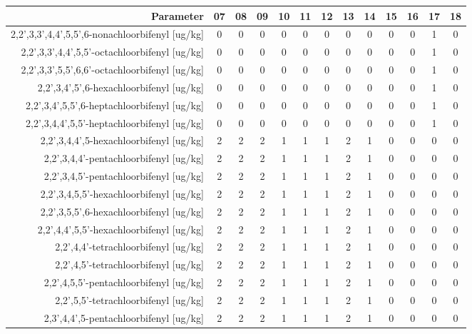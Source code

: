 \begin{tabular}{ r |c | c | c | c | c |c | c | c | c | c | c | c } 
\rowcolor[HTML]{EFEFEF}  
 Parameter & 07 & 08 & 09 & 10 & 11 & 12 & 13 & 14 & 15 & 16 & 17 & 18 \\    \hline     
2,2',3,3',4,4',5,5',6-nonachloorbifenyl [ug/kg] &0 & 0 & 0 & 0 & 0 & 0 & 0 & 0 & 0 & 0 & 1 & 0 \\
2,2',3,3',4,4',5,5'-octachloorbifenyl [ug/kg] &0 & 0 & 0 & 0 & 0 & 0 & 0 & 0 & 0 & 0 & 1 & 0 \\
2,2',3,3',5,5',6,6'-octachloorbifenyl [ug/kg] &0 & 0 & 0 & 0 & 0 & 0 & 0 & 0 & 0 & 0 & 1 & 0 \\
2,2',3,4',5',6-hexachloorbifenyl [ug/kg] &0 & 0 & 0 & 0 & 0 & 0 & 0 & 0 & 0 & 0 & 1 & 0 \\
2,2',3,4',5,5',6-heptachloorbifenyl [ug/kg] &0 & 0 & 0 & 0 & 0 & 0 & 0 & 0 & 0 & 0 & 1 & 0 \\
2,2',3,4,4',5,5'-heptachloorbifenyl [ug/kg] &0 & 0 & 0 & 0 & 0 & 0 & 0 & 0 & 0 & 0 & 1 & 0 \\
2,2',3,4,4',5-hexachloorbifenyl [ug/kg] &2 & 2 & 2 & 1 & 1 & 1 & 2 & 1 & 0 & 0 & 0 & 0 \\
2,2',3,4,4'-pentachloorbifenyl [ug/kg] &2 & 2 & 2 & 1 & 1 & 1 & 2 & 1 & 0 & 0 & 0 & 0 \\
2,2',3,4,5'-pentachloorbifenyl [ug/kg] &2 & 2 & 2 & 1 & 1 & 1 & 2 & 1 & 0 & 0 & 0 & 0 \\
2,2',3,4,5,5'-hexachloorbifenyl [ug/kg] &2 & 2 & 2 & 1 & 1 & 1 & 2 & 1 & 0 & 0 & 0 & 0 \\
2,2',3,5,5',6-hexachloorbifenyl [ug/kg] &2 & 2 & 2 & 1 & 1 & 1 & 2 & 1 & 0 & 0 & 0 & 0 \\
2,2',4,4',5,5'-hexachloorbifenyl [ug/kg] &2 & 2 & 2 & 1 & 1 & 1 & 2 & 1 & 0 & 0 & 0 & 0 \\
2,2',4,4'-tetrachloorbifenyl [ug/kg] &2 & 2 & 2 & 1 & 1 & 1 & 2 & 1 & 0 & 0 & 0 & 0 \\
2,2',4,5'-tetrachloorbifenyl [ug/kg] &2 & 2 & 2 & 1 & 1 & 1 & 2 & 1 & 0 & 0 & 0 & 0 \\
2,2',4,5,5'-pentachloorbifenyl [ug/kg] &2 & 2 & 2 & 1 & 1 & 1 & 2 & 1 & 0 & 0 & 0 & 0 \\
2,2',5,5'-tetrachloorbifenyl [ug/kg] &2 & 2 & 2 & 1 & 1 & 1 & 2 & 1 & 0 & 0 & 0 & 0 \\
2,3',4,4',5-pentachloorbifenyl [ug/kg] &2 & 2 & 2 & 1 & 1 & 1 & 2 & 1 & 0 & 0 & 0 & 0 \\
\end{tabular}    
